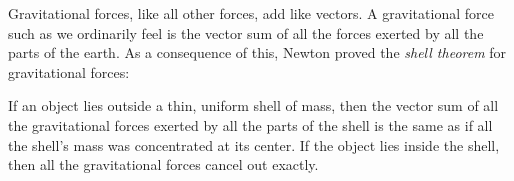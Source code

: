 \begin{summary}
\begin{summarytext}
Gravitational forces, like all other forces, add like
vectors. A gravitational force such as we ordinarily feel is
the vector sum of all the forces exerted by all the parts of
the earth. As a consequence of this, Newton proved the
\emph{shell theorem} for gravitational forces:

If an object lies outside a thin, uniform shell of mass,
then the vector sum of all the gravitational forces exerted
by all the parts of the shell is the same as if all the
shell's mass was concentrated at its center.  If the object
lies inside the shell, then all the gravitational forces cancel out exactly.

\end{summarytext}

\end{summary}
